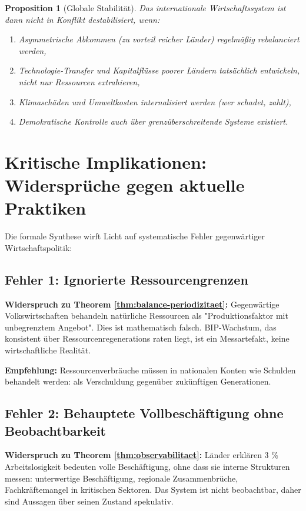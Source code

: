 \documentclass[a4paper, 12pt, twoside, openright]{report}
\newtheorem{proposition}[theorem]{Proposition}
\theoremstyle{definition}
\theoremstyle{definition}
\begin{document}
\begin{proposition}[Globale Stabilität]
Das internationale Wirtschaftssystem ist dann nicht in Konflikt destabilisiert, wenn:
\begin{enumerate}
\item Asymmetrische Abkommen (zu vorteil reicher Länder) regelmäßig rebalanciert werden,
\item Technologie-Transfer und Kapitalflüsse poorer Ländern tatsächlich entwickeln, nicht nur Ressourcen extrahieren,
\item Klimaschäden und Umweltkosten internalisiert werden (wer schadet, zahlt),
\item Demokratische Kontrolle auch über grenzüberschreitende Systeme existiert.
\end{enumerate}
\end{proposition}

\section{Kritische Implikationen: Widersprüche gegen aktuelle Praktiken}

Die formale Synthese wirft Licht auf systematische Fehler gegenwärtiger Wirtschaftspolitik:

\subsection{Fehler 1: Ignorierte Ressourcengrenzen}

\textbf{Widerspruch zu Theorem \ref{thm:balance-periodizitaet}:}
Gegenwärtige Volkswirtschaften behandeln natürliche Ressourcen als "Produktionsfaktor mit unbegrenztem Angebot". Dies ist mathematisch falsch. BIP-Wachstum, das konsistent über Ressourcenregenerations raten liegt, ist ein Messartefakt, keine wirtschaftliche Realität.

\textbf{Empfehlung:} Ressourcenverbräuche müssen in nationalen Konten wie Schulden behandelt werden: als Verschuldung gegenüber zukünftigen Generationen.

\subsection{Fehler 2: Behauptete Vollbeschäftigung ohne Beobachtbarkeit}

\textbf{Widerspruch zu Theorem \ref{thm:observabilitaet}:}
Länder erklären 3 \% Arbeitslosigkeit bedeuten volle Beschäftigung, ohne dass sie interne Strukturen messen: unterwertige Beschäftigung, regionale Zusammenbrüche, Fachkräftemangel in kritischen Sektoren. Das System ist nicht beobachtbar, daher sind Aussagen über seinen Zustand spekulativ.
\end{document}
